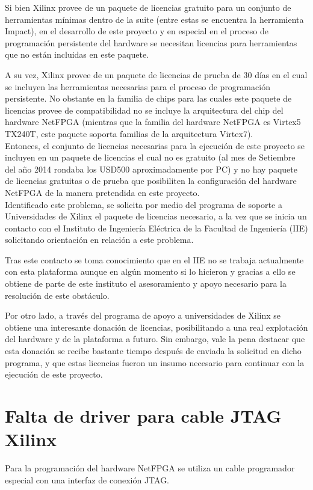 Si bien Xilinx provee de un paquete de licencias gratuito para un conjunto de herramientas mínimas dentro de la suite (entre estas se encuentra la herramienta Impact), en el desarrollo de este proyecto y en especial en el proceso de programaci\'on persistente del hardware se necesitan licencias para herramientas que no están incluidas en este paquete.

A su vez, Xilinx provee de un paquete de licencias de prueba de 30 días en el cual se incluyen las herramientas necesarias para el proceso de programaci\'on persistente. No obstante en la familia de chips para las cuales este paquete de licencias provee de compatibilidad no se incluye la arquitectura del chip del hardware NetFPGA (mientras que la familia del hardware NetFPGA es Virtex5 TX240T, este paquete soporta familias de la arquitectura Virtex7).\\

Entonces, el conjunto de licencias necesarias para la ejecuci\'on de este proyecto se incluyen en un paquete de licencias el cual no es gratuito (al mes de Setiembre del año 2014 rondaba los USD500 aproximadamente por PC) y no hay paquete de licencias gratuitas o de prueba que posibiliten la configuraci\'on del hardware NetFPGA de la manera pretendida en este proyecto.\\

Identificado este problema, se solicita por medio del programa de soporte a Universidades de Xilinx el paquete de licencias necesario, a la vez que se inicia un contacto con el Instituto de Ingeniería Eléctrica de la Facultad de Ingeniería (IIE) solicitando orientación en relación a este problema.

Tras este contacto se toma conocimiento que en el IIE no se trabaja actualmente con esta plataforma aunque en alg\'un momento si lo hicieron y gracias a ello se obtiene de parte de este instituto
el asesoramiento y apoyo necesario para la resolución de este obstáculo. 

Por otro lado, a través del programa de apoyo a universidades de Xilinx se obtiene una interesante donación de licencias, posibilitando a una real explotación del hardware y de la plataforma a futuro. Sin embargo, vale la pena destacar que esta donaci\'on se recibe bastante tiempo después de enviada la solicitud en dicho programa, y que estas licencias fueron un insumo necesario para continuar con la ejecuci\'on de este proyecto.  

\section{Falta de driver para cable JTAG Xilinx}
Para la programación del hardware NetFPGA se utiliza un cable programador especial con una interfaz de conexi\'on JTAG. 

